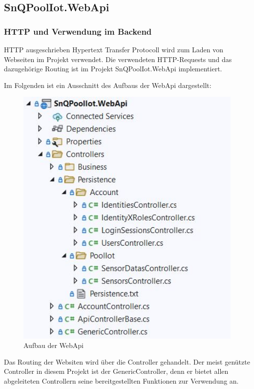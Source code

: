 \subsection{SnQPoolIot.WebApi}

\subsubsection*{HTTP und Verwendung im Backend}

HTTP ausgeschrieben Hypertext Transfer Protocoll wird zum Laden von Webseiten im Projekt verwendet.
Die verwendeten HTTP-Requests und das dazugehörige Routing ist im Projekt SnQPoolIot.WebApi implementiert.

Im Folgenden ist ein Ausschnitt des Aufbaus der WebApi dargestellt:

\begin{figure}[H]
    \centering
    \includegraphics[width=1\textwidth]{pics/HTTPRequestsWebApi.JPG}
    \caption{Aufbau der WebApi}
\end{figure}


Das Routing der Websiten wird über die Controller gehandelt. 
Der meist genützte Controller in diesem Projekt ist der GenericController, denn er bietet allen abgeleiteten Controllern seine bereitgestellten Funktionen zur Verwendung an. \cite{Generics}

